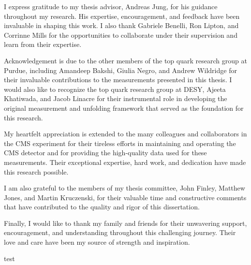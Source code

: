 \begin{acknowledgments}
I express gratitude to my thesis advisor, Andreas Jung, for his guidance throughout my research. His expertise, encouragement, and feedback have been invaluable in shaping this work. 
I also thank Gabriele Benelli, Ron Lipton, and Corrinne Mills for the opportunities to collaborate under their supervision and learn from their expertise.

Acknowledgement is due to the other members of the top quark research group at Purdue, including Amandeep Bakshi, Giulia Negro, and Andrew Wildridge for their invaluable contributions to the measurements presented in this thesis. 
I would also like to recognize the top quark research group at DESY, Ajeeta Khatiwada, and Jacob Linacre for their instrumental role in developing the original measurement and unfolding framework that served as the foundation for this research.

My heartfelt appreciation is extended to the many colleagues and collaborators in the CMS experiment for their tireless efforts in maintaining and operating the CMS detector and for providing the high-quality data used for these measurements. 
Their exceptional expertise, hard work, and dedication have made this research possible.

I am also grateful to the members of my thesis committee, John Finley, Matthew Jones, and Martin Kruczenski, for their valuable time and constructive comments that have contributed to the quality and rigor of this dissertation.

Finally, I would like to thank my family and friends for their unwavering support, encouragement, and understanding throughout this challenging journey. 
Their love and care have been my source of strength and inspiration.
\end{acknowledgments}


\begin{preface}
test
\end{preface}

%

